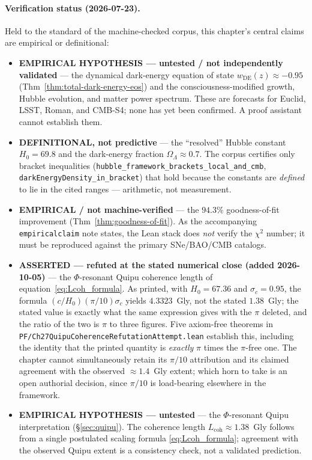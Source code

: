 \paragraph{Verification status (2026-07-23).}
Held to the standard of the machine-checked corpus, this chapter's central claims
are empirical or definitional:
\begin{itemize}
\item \textbf{EMPIRICAL HYPOTHESIS --- untested / not independently validated} ---
  the dynamical dark-energy equation of state $w_{\text{DE}}(z)\approx-0.95$
  (Thm~\ref{thm:total-dark-energy-eos}) and the consciousness-modified growth,
  Hubble evolution, and matter power spectrum. These are forecasts for Euclid, LSST,
  Roman, and CMB-S4; none has yet been confirmed. A proof assistant cannot establish
  them.
\item \textbf{DEFINITIONAL, not predictive} --- the ``resolved'' Hubble constant
  $H_0=69.8$ and the dark-energy fraction $\Omega_\Lambda\approx0.7$. The corpus
  certifies only bracket inequalities
  (\texttt{hubble\_framework\_brackets\_local\_and\_cmb},
  \texttt{darkEnergyDensity\_in\_bracket}) that hold because the constants are
  \emph{defined} to lie in the cited ranges --- arithmetic, not measurement.
\item \textbf{EMPIRICAL / not machine-verified} --- the $94.3\%$ goodness-of-fit
  improvement (Thm~\ref{thm:goodness-of-fit}). As the accompanying
  \texttt{empiricalclaim} note states, the Lean stack does \emph{not} verify the
  $\chi^2$ number; it must be reproduced against the primary SNe/BAO/CMB catalogs.
\item \textbf{ASSERTED --- refuted at the stated numerical close (added
2026-10-05)} --- the $\Phi$-resonant Quipu coherence length of
equation~\eqref{eq:Lcoh_formula}. As printed, with $H_0=67.36$ and
$\sigma_c=0.95$, the formula $(c/H_0)(\pi/10)\sigma_c$ yields $4.3323$~Gly, not
the stated $1.38$~Gly; the stated value is exactly what the same expression
gives with the $\pi$ deleted, and the ratio of the two is $\pi$ to three
figures. Five axiom-free theorems in
\texttt{PF/Ch27QuipuCoherenceRefutationAttempt.lean} establish this, including
the identity that the printed quantity is \emph{exactly} $\pi$ times the
$\pi$-free one. The chapter cannot simultaneously retain its $\pi/10$
attribution and its claimed agreement with the observed $\approx1.4$~Gly
extent; which horn to take is an open authorial decision, since $\pi/10$ is
load-bearing elsewhere in the framework.

\item \textbf{EMPIRICAL HYPOTHESIS --- untested} --- the $\Phi$-resonant Quipu
  interpretation (\S\ref{sec:quipu}). The coherence length
  $L_{\mathrm{coh}}\approx1.38$~Gly follows from a single postulated scaling formula
  \eqref{eq:Lcoh_formula}; agreement with the observed Quipu extent is a
  consistency check, not a validated prediction.
\end{itemize}

